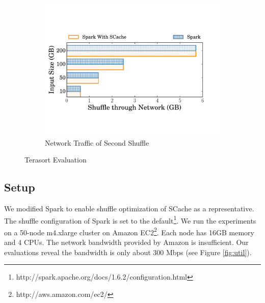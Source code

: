 \begin{figure}
\begin{minipage}[t]{.32\linewidth}
\begin{subfigure}{\linewidth}
			\begin{minipage}{\linewidth}
				\vspace{0.5em}
				\includegraphics[width=\linewidth]{fig/tera_shuffle}
				\caption{Network Traffic of Second Shuffle}
				\label{fig:terashuffle}
			\end{minipage}
		\end{subfigure}
		\caption{Terasort Evaluation}
	\end{minipage}
\end{figure}

\subsection{Setup}\label{stepup}
We modified Spark to enable shuffle optimization of SCache as a representative.
The shuffle configuration of Spark is set to the default\footnote{http://spark.apache.org/docs/1.6.2/configuration.html}. 
We run the experiments on a 50-node m4.xlarge cluster on Amazon EC2\footnote{http://aws.amazon.com/ec2/}. 
Each node has 16GB memory and 4 CPUs. The network bandwidth provided by Amazon is insufficient. 
Our evaluations reveal the bandwidth is only about 300 Mbps (see Figure \ref{fig:util}).

